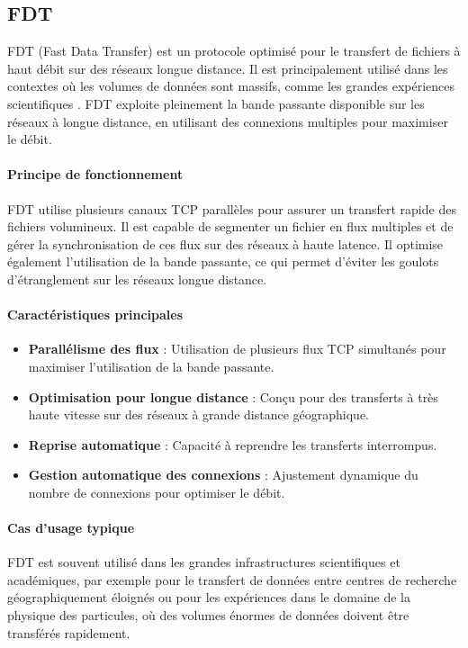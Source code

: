 \subsection{FDT}
FDT (Fast Data Transfer) est un protocole optimisé pour le transfert de fichiers à haut débit sur des réseaux longue distance. Il est principalement utilisé dans les contextes où les volumes de données sont massifs, comme les grandes expériences scientifiques \cite{hp-transfer}. FDT exploite pleinement la bande passante disponible sur les réseaux à longue distance, en utilisant des connexions multiples pour maximiser le débit.

\paragraph{Principe de fonctionnement}
FDT utilise plusieurs canaux TCP parallèles pour assurer un transfert rapide des fichiers volumineux. Il est capable de segmenter un fichier en flux multiples et de gérer la synchronisation de ces flux sur des réseaux à haute latence. Il optimise également l’utilisation de la bande passante, ce qui permet d’éviter les goulots d’étranglement sur les réseaux longue distance.\cite{nadig2018comparative}

\paragraph{Caractéristiques principales} \begin{itemize} \item \textbf{Parallélisme des flux} : Utilisation de plusieurs flux TCP simultanés pour maximiser l'utilisation de la bande passante. \item \textbf{Optimisation pour longue distance} : Conçu pour des transferts à très haute vitesse sur des réseaux à grande distance géographique. \item \textbf{Reprise automatique} : Capacité à reprendre les transferts interrompus. \item \textbf{Gestion automatique des connexions} : Ajustement dynamique du nombre de connexions pour optimiser le débit. \end{itemize}

\paragraph{Cas d'usage typique}
FDT est souvent utilisé dans les grandes infrastructures scientifiques et académiques, par exemple pour le transfert de données entre centres de recherche géographiquement éloignés ou pour les expériences dans le domaine de la physique des particules, où des volumes énormes de données doivent être transférés rapidement.

